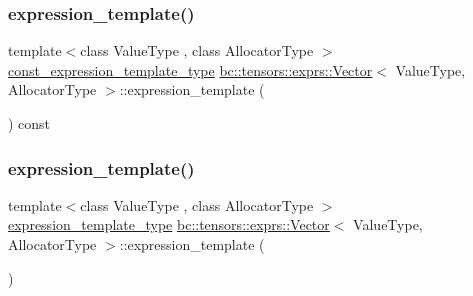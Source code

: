 \subsubsection{\texorpdfstring{expression\+\_\+template()}{expression\_template()}\hspace{0.1cm}{\footnotesize\ttfamily [1/2]}}
{\footnotesize\ttfamily template$<$class Value\+Type , class Allocator\+Type $>$ \\
\hyperlink{structbc_1_1tensors_1_1exprs_1_1Kernel__Array}{const\+\_\+expression\+\_\+template\+\_\+type} \hyperlink{structbc_1_1tensors_1_1exprs_1_1Vector}{bc\+::tensors\+::exprs\+::\+Vector}$<$ Value\+Type, Allocator\+Type $>$\+::expression\+\_\+template (\begin{DoxyParamCaption}{ }\end{DoxyParamCaption}) const\hspace{0.3cm}{\ttfamily [inline]}}

\mbox{\label{structbc_1_1tensors_1_1exprs_1_1Vector_ad5c1189f69b902afa3f7f64d7c5d052c}} 
\subsubsection{\texorpdfstring{expression\+\_\+template()}{expression\_template()}\hspace{0.1cm}{\footnotesize\ttfamily [2/2]}}
{\footnotesize\ttfamily template$<$class Value\+Type , class Allocator\+Type $>$ \\
\hyperlink{structbc_1_1tensors_1_1exprs_1_1Kernel__Array}{expression\+\_\+template\+\_\+type} \hyperlink{structbc_1_1tensors_1_1exprs_1_1Vector}{bc\+::tensors\+::exprs\+::\+Vector}$<$ Value\+Type, Allocator\+Type $>$\+::expression\+\_\+template (\begin{DoxyParamCaption}{ }\end{DoxyParamCaption})\hspace{0.3cm}{\ttfamily [inline]}}

\mbox{\label{structbc_1_1tensors_1_1exprs_1_1Vector_aeca332b35e2515e9d6dadbf03289f6cc}} 
